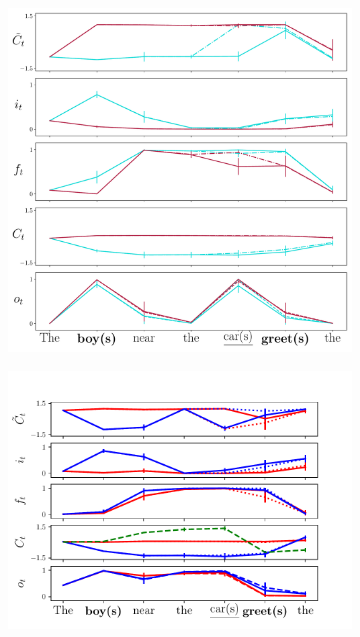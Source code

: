 \begin{figure}[ht]
\begin{subfigure}{0.3\textwidth}
            \includegraphics[width=\linewidth]{Figures/nounpp_987.pdf}
    \label{fig:998-timeseries}
    \end{subfigure}
    \begin{subfigure}{0.3\textwidth}
            \centering
            \includegraphics[width=\linewidth]{Figures/nounpp_775.pdf}
    \label{fig:775-timeseries}

\end{subfigure}
\end{figure}
